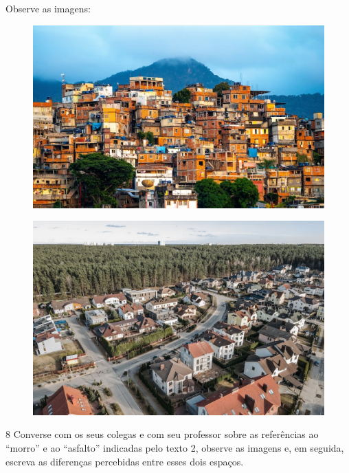 \pagebreak
Observe as imagens:

\begin{figure}[htpb!]
\includegraphics[width=\textwidth]{./imgs/img41.png}
\end{figure}

\begin{figure}[htpb!]
\includegraphics[width=\textwidth]{./imgs/img42.png}
\end{figure}



\num{8} Converse com os seus colegas e com seu professor sobre as referências ao
“morro” e ao “asfalto” indicadas pelo texto 2, observe as imagens e, em
seguida, escreva as diferenças percebidas entre esses dois espaços.


